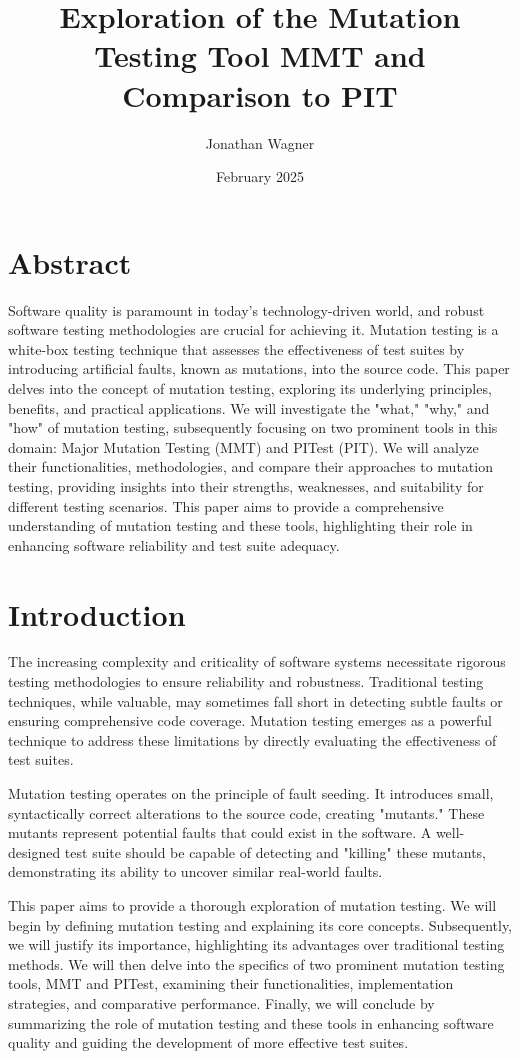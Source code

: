 \documentclass[sigplan, nonacm]{acmart}
\title{Exploration of the Mutation Testing Tool MMT and Comparison to PIT}
\author{Jonathan Wagner}
\affiliation{\institution{Philipps-University Marburg}
\city{Marburg}
\country{Germany}}
\date{February 2025}
\begin{document}
\maketitle

\section*{Abstract}

Software quality is paramount in today's technology-driven world, and robust software testing
methodologies are crucial for achieving it. Mutation testing is a white-box testing technique that
assesses the effectiveness of test suites by introducing artificial faults, known as mutations,
into the source code. This paper delves into the concept of mutation testing, exploring its
underlying principles, benefits, and practical applications. We will investigate the "what,"
"why," and "how" of mutation testing, subsequently focusing on two prominent tools in this domain:
Major Mutation Testing (MMT) and PITest (PIT). We will analyze their functionalities,
methodologies, and compare their approaches to mutation testing, providing insights into their
strengths, weaknesses, and suitability for different testing scenarios. This paper aims to provide
a comprehensive understanding of mutation testing and these tools, highlighting their role in
enhancing software reliability and test suite adequacy.

\section{Introduction}

The increasing complexity and criticality of software systems necessitate rigorous testing
methodologies to ensure reliability and robustness. Traditional testing techniques, while valuable,
may sometimes fall short in detecting subtle faults or ensuring comprehensive code coverage.
Mutation testing emerges as a powerful technique to address these limitations by directly
evaluating the effectiveness of test suites.

Mutation testing operates on the principle of fault seeding. It introduces small, syntactically
correct alterations to the source code, creating "mutants." These mutants represent potential
faults that could exist in the software. A well-designed test suite should be capable of detecting
and "killing" these mutants, demonstrating its ability to uncover similar real-world faults.

This paper aims to provide a thorough exploration of mutation testing. We will begin by defining
mutation testing and explaining its core concepts. Subsequently, we will justify its importance,
highlighting its advantages over traditional testing methods. We will then delve into the specifics
of two prominent mutation testing tools, MMT and PITest, examining their functionalities,
implementation strategies, and comparative performance. Finally, we will conclude by summarizing
the role of mutation testing and these tools in enhancing software quality and guiding the
development of more effective test suites.
\end{document}
